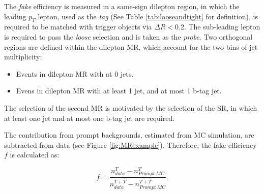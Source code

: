 The \emph{fake} efficiency is measured in a same-sign dilepton region, in which the leading $p_T$ lepton, used as the \emph{tag} (See Table \ref{tab:looseandtight} for definition), is required to be matched with trigger objects via $\Delta R<$0.2. The sub-leading lepton is required to pass the \emph{loose} selection and is taken as the \emph{probe}. Two orthogonal regions are defined within the dilepton MR, which account for the two bins of jet multiplicity:

\begin{itemize}
\item Events in dilepton MR with at 0 jets.
\item Evens in dilepton MR with at least 1 jet, and at most 1 b-tag jet.
\end{itemize}

The selection of the second MR is motivated by the selection of the SR, in which at least one jet and at most one b-tag jet are required. 

The contribution from prompt backgrounds, estimated from MC simulation, are subtracted from data (see Figure \ref{fig:MRexample}). Therefore, the fake efficiency $f$ is calculated as:

\begin{equation}
f=\frac{n_{data}^{T}-n_{Prompt~MC}^{T}}{n_{data}^{T+\overline{T}}-n_{Prompt~MC}^{T+\overline{T}}}.
\label{eq:f_eq}
\end{equation}  

